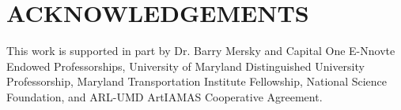 \documentclass[letterpaper, 10 pt, conference]{ieeeconf}  %
\begin{document}








\section*{ACKNOWLEDGEMENTS} This work is supported in part by Dr. Barry Mersky and 
Capital One E-Nnovte Endowed Professorships, University of Maryland Distinguished University Professorship, Maryland Transportation Institute Fellowship, National 
Science Foundation, and ARL-UMD ArtIAMAS Cooperative Agreement.



\end{document}
